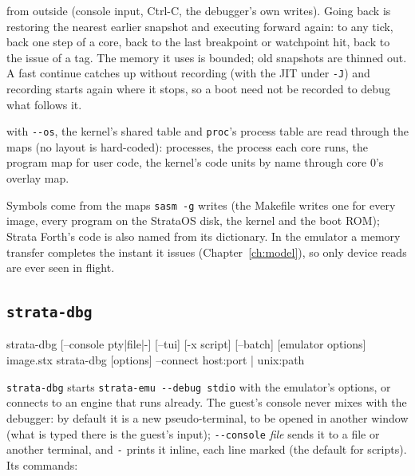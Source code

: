 \begin{description}[leftmargin=1em,style=nextline]
  from outside (console input, Ctrl-C, the debugger's own writes). Going back is restoring the nearest
  earlier snapshot and executing forward again: to any tick, back one step of a core, back to the last
  breakpoint or watchpoint hit, back to the issue of a tag. The memory it uses is bounded; old snapshots
  are thinned out. A fast continue catches up without recording (with the JIT under \texttt{-J}) and
  recording starts again where it stops, so a boot need not be recorded to debug what follows it.
\item[StrataOS] with \texttt{-{}-os}, the kernel's shared table and \texttt{proc}'s process table are
  read through the maps (no layout is hard-coded): processes, the process each core runs, the program
  map for user code, the kernel's code units by name through core 0's overlay map.
\end{description}

Symbols come from the maps \texttt{sasm -g} writes (the Makefile writes one for every image, every
program on the StrataOS disk, the kernel and the boot ROM); Strata Forth's code is also named from its
dictionary. In the emulator a memory transfer completes the instant it issues (Chapter~\ref{ch:model}),
so only device reads are ever seen in flight.

\subsection{\texttt{strata-dbg}}

\begin{shell}
strata-dbg [--console pty|file|-] [--tui] [-x script] [--batch] [emulator options] image.stx
strata-dbg [options] --connect host:port | unix:path
\end{shell}

\texttt{strata-dbg} starts \texttt{strata-emu -{}-debug stdio} with the emulator's options, or connects
to an engine that runs already. The guest's console never mixes with the debugger: by default it is a
new pseudo-terminal, to be opened in another window (what is typed there is the guest's input);
\texttt{-{}-console} \textit{file} sends it to a file or another terminal, and \texttt{-} prints it
inline, each line marked (the default for scripts). Its commands:

